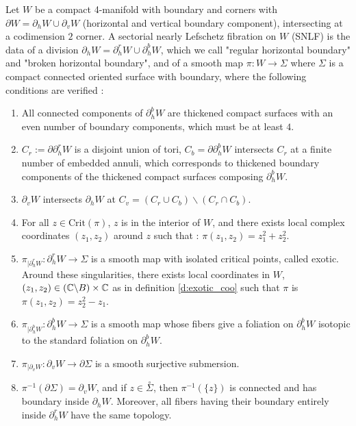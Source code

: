 \documentclass[../main.tex]{subfiles}
\begin{document}
\begin{definition}
Let $W$ be a compact 4-manifold with boundary and corners with $\partial W = \partial_hW\cup \partial_vW$ (horizontal and vertical boundary component), intersecting at a codimension $2$ corner. A sectorial nearly Lefschetz fibration on $W$ (SNLF) is the data of a division $\partial_hW = \partial_h^rW \cup \partial_h^bW$, which we call "regular horizontal boundary" and "broken horizontal boundary", and of a smooth map $\pi : W \rightarrow \Sigma$ where $\Sigma$ is a compact connected oriented surface with boundary, where the following conditions are verified :
\begin{enumerate}
    \item All connected components of $\partial_h^bW$ are thickened compact surfaces with an even number of boundary components, which must be at least $4$. 
    \item $C_r :=\partial\partial_h^rW$ is a disjoint union of tori, $C_b = \partial\partial_h^b W$ intersects $C_r$ at a finite number of embedded annuli, which corresponds to thickened boundary components of the thickened compact surfaces composing $\partial_h^b W$.
    \item $\partial_vW $ intersects $\partial_hW$ at $C_v = (C_r\cup C_b)\backslash (C_r\cap C_b)$.
    \item For all $z\in \text{Crit}(\pi)$, $z$ is in the interior of $W$, and there exists local complex coordinates $(z_1,z_2)$ around $z$ such that : $\pi(z_1,z_2) = z_1^2 + z_2^2$.
    \item $\pi_{|\partial_h^rW}: \partial_h^rW \rightarrow \Sigma$ is a smooth map with isolated critical points, called exotic. Around these singularities, there exists local coordinates in $W$, $(z_1,z_2)\in (\mathbb{C}\backslash B)\times \mathbb{C}$ as in definition \ref{d:exotic_coo} such that $\pi$ is $\pi(z_1,z_2) = z_2^2 - z_1$.
    \item $\pi_{|\partial_h^bW}: \partial_h^bW \rightarrow \Sigma$ is a smooth map whose fibers give a foliation on $\partial_h^b W$ isotopic to the standard foliation on $\partial_h^b W$. 
    \item $\pi_{|\partial_vW} : \partial_vW \rightarrow \partial\Sigma$ is a smooth surjective submersion. 
    \item $\pi^{-1}(\partial\Sigma) = \partial_v W$, and if $z \in\overset\circ \Sigma$, then $\pi^{-1}(\{z\})$ is connected and has boundary inside $\partial_hW$. Moreover, all fibers having their boundary entirely inside $\partial_h^rW$ have the same topology. 
\end{enumerate}

\end{definition}
\end{document}
